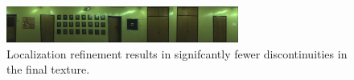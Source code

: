 \message{ !name(paper.tex)}\documentclass[10pt,twocolumn,letterpaper]{article}
\begin{document}
\begin{figure}
  \centering
  \includegraphics[width=3in]{wall1_cache_full_shifted.jpg}
  \caption{Localization refinement results in signifcantly fewer
    discontinuities in the final texture.}
  \label{fig:shifted}
\end{figure}
\end{document}
